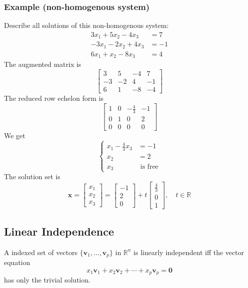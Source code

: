\documentclass[../linear-algebra.tex]{subfiles}
\begin{document}
\subsubsection{Example (non-homogenous system)}
Describe all solutions of this non-homogenous system:
\[
\begin{aligned}
3x_1 + 5x_2 - 4x_3 &= 7 \\
-3x_1 - 2x_2 + 4x_3 &= -1 \\
6x_1 + x_2 - 8x_3 &= 4
\end{aligned}
\]
The augmented matrix is
\[
\left[
\begin{array}{ccc|c}
3 & 5 & -4 & 7 \\
-3 & -2 & 4 & -1 \\
6 & 1 & -8 & -4
\end{array}
\right]
\]
The reduced row echelon form is
\[
\left[
\begin{array}{ccc|c}
1 & 0 & -\frac{4}{3} & -1 \\
0 & 1 & 0 & 2 \\
0 & 0 & 0 & 0
\end{array}
\right]
\]
We get
\[
\left\{
\begin{aligned}
x_1 - \frac{4}{3}x_3 &= -1 \\
x_2 &= 2 \\
x_3 &\text{ is free}
\end{aligned}
\right.
\]
The solution set is
\[
\mathbf{x} = 
\begin{bmatrix} 
x_1 \\ 
x_2 \\ 
x_3 
\end{bmatrix} 
= 
\begin{bmatrix} 
-1 \\ 
2 \\ 
0 
\end{bmatrix} 
+ t 
\begin{bmatrix} 
\frac{4}{3} \\ 
0 \\ 
1 
\end{bmatrix},\quad
t\in\mathbb{R}
\]

\subsection{Linear Independence}
A indexed set of vectors $\{\mathbf{v}_1,\ldots,\mathbf{v}_p\}$ in $\mathbb{R}^n$
is linearly independent iff the vector equation
\[x_1\mathbf{v}_1 + x_2\mathbf{v}_2 + \cdots + x_p\mathbf{v}_p = \mathbf{0}\]
has only the trivial solution.
\end{document}
